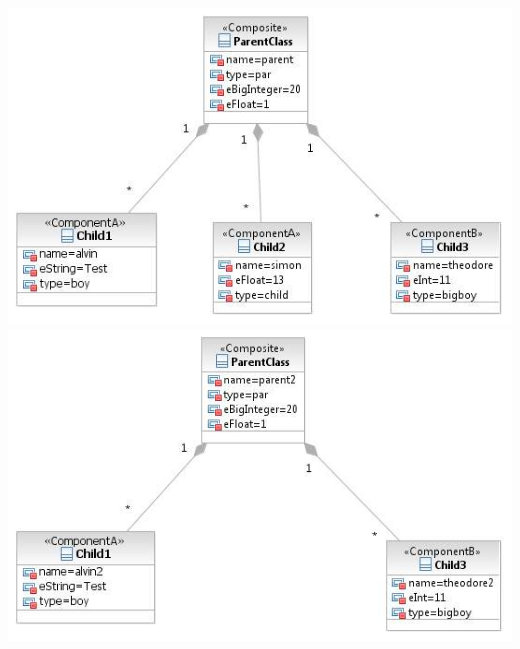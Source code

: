 \documentclass[a4paper]{article}
\begin{document}
\begin{description}
	\includegraphics[scale=0.5]{CompareChildrenEqualTypeTestScreens/Testcase04model1.jpeg}
	\includegraphics[scale=0.5]{CompareChildrenEqualTypeTestScreens/Testcase04model2.jpeg}
	\end{description}
\end{document}
